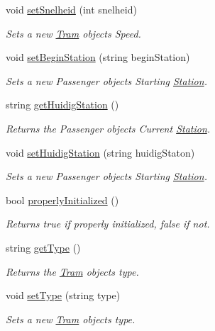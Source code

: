 \begin{DoxyCompactItemize}
void \hyperlink{classTram_a2853d9b5d5d519e6757e6e3480d3b1c6}{set\+Snelheid} (int snelheid)
\begin{DoxyCompactList}\small\item\em Sets a new \hyperlink{classTram}{Tram} object\textquotesingle{}s Speed. \end{DoxyCompactList}\item 
void \hyperlink{classTram_a1f940f1fa5c8be660561f24750f25dd7}{set\+Begin\+Station} (string begin\+Station)
\begin{DoxyCompactList}\small\item\em Sets a new Passenger object\textquotesingle{}s Starting \hyperlink{classStation}{Station}. \end{DoxyCompactList}\item 
string \hyperlink{classTram_a1e28b662a6ef3833faa2920247a139ee}{get\+Huidig\+Station} ()
\begin{DoxyCompactList}\small\item\em Returns the Passenger object\textquotesingle{}s Current \hyperlink{classStation}{Station}. \end{DoxyCompactList}\item 
void \hyperlink{classTram_acb4190c4fb33d7d97de38ea3a25a3522}{set\+Huidig\+Station} (string huidig\+Staton)
\begin{DoxyCompactList}\small\item\em Sets a new Passenger object\textquotesingle{}s Starting \hyperlink{classStation}{Station}. \end{DoxyCompactList}\item 
bool \hyperlink{classTram_ac69cbbacaed7e1b9e60e608d766d02ee}{properly\+Initialized} ()
\begin{DoxyCompactList}\small\item\em Returns true if properly initialized, false if not. \end{DoxyCompactList}\item 
string \hyperlink{classTram_a8ce9cb84e51d57bb975faa5aa0d06ad2}{get\+Type} ()
\begin{DoxyCompactList}\small\item\em Returns the \hyperlink{classTram}{Tram} object\textquotesingle{}s type. \end{DoxyCompactList}\item 
void \hyperlink{classTram_ae68c0ba51b98ed6fddee64cfe4410f7e}{set\+Type} (string type)
\begin{DoxyCompactList}\small\item\em Sets a new \hyperlink{classTram}{Tram} object\textquotesingle{}s type. \end{DoxyCompactList}\item 

\end{DoxyCompactItemize}
